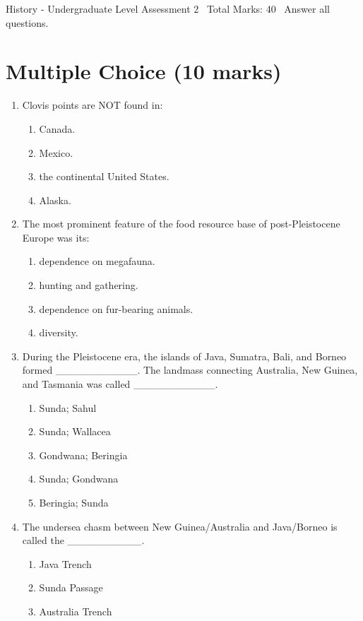 \documentclass[12pt]{article}
\begin{document}
\begin{center}
History - Undergraduate Level Assessment 2 \
Total Marks: 40 \
Answer all questions.
\end{center}

\section*{Multiple Choice (10 marks)}
\begin{enumerate}[label=\arabic*.]
\item Clovis points are NOT found in:
\begin{enumerate}[label=(\alph*)]
    \item Canada.
    \item Mexico.
    \item the continental United States.
    \item Alaska.
\end{enumerate}
\item The most prominent feature of the food resource base of post-Pleistocene Europe was its:
\begin{enumerate}[label=(\alph*)]
    \item dependence on megafauna.
    \item hunting and gathering.
    \item dependence on fur-bearing animals.
    \item diversity.
\end{enumerate}
\item During the Pleistocene era, the islands of Java, Sumatra, Bali, and Borneo formed
\_\_\_\_\_\_\_\_\_\_\_. The landmass connecting Australia, New Guinea, and Tasmania was called
\_\_\_\_\_\_\_\_\_\_\_.
\begin{enumerate}[label=(\alph*)]
    \item Sunda; Sahul
    \item Sunda; Wallacea
    \item Gondwana; Beringia
    \item Sunda; Gondwana
    \item Beringia; Sunda
\end{enumerate}
\item The undersea chasm between New Guinea/Australia and Java/Borneo is called the \_\_\_\_\_\_\_\_\_\_.
\begin{enumerate}[label=(\alph*)]
    \item Java Trench
    \item Sunda Passage
    \item Australia Trench

\end{enumerate}
\end{enumerate}
\end{document}
